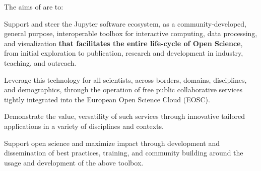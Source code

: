 
\noindent The aims of \TheProject are to:

\begin{compactenum}
\item Support and steer the Jupyter software ecosystem, as a
  community-developed, general purpose, interoperable toolbox for
  interactive computing, data processing, and visualization
  \textbf{that facilitates the entire life-cycle of Open Science},
  from initial exploration to publication, research and development in
  industry, teaching, and outreach.

\item Leverage this technology for all scientists, across borders,
  domains, disciplines, and demographics, through the operation of
  free public collaborative services tightly integrated into the
  European Open Science Cloud (EOSC).

\item Demonstrate the value, versatility of such services through
  innovative tailored applications in a variety of disciplines and
  contexts.

\item Support open science and maximize impact through development and
  dissemination of best practices, training, and community building
  around the usage and development of the above toolbox.
\end{compactenum}

